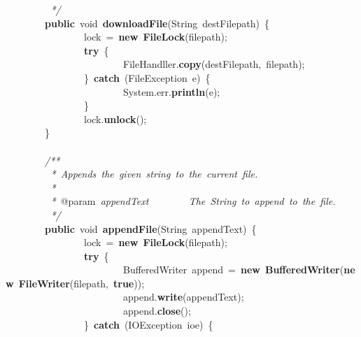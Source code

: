 \mbox{}\textit{\ \ \ \ \ \ \ \ \ */} \\
\mbox{}\ \ \ \ \ \ \ \ \textbf{public}\ void\ \textbf{downloadFile}(String\ destFilepath)\ \{ \\
\mbox{}\ \ \ \ \ \ \ \ \ \ \ \ \ \ \ \ lock\ =\ \textbf{new}\ \textbf{FileLock}(filepath); \\
\mbox{}\ \ \ \ \ \ \ \ \ \ \ \ \ \ \ \ \textbf{try}\ \{ \\
\mbox{}\ \ \ \ \ \ \ \ \ \ \ \ \ \ \ \ \ \ \ \ \ \ \ \ FileHandller.\textbf{copy}(destFilepath,\ filepath); \\
\mbox{}\ \ \ \ \ \ \ \ \ \ \ \ \ \ \ \ \}\ \textbf{catch}\ (FileException\ e)\ \{ \\
\mbox{}\ \ \ \ \ \ \ \ \ \ \ \ \ \ \ \ \ \ \ \ \ \ \ \ System.err.\textbf{println}(e); \\
\mbox{}\ \ \ \ \ \ \ \ \ \ \ \ \ \ \ \ \} \\
\mbox{}\ \ \ \ \ \ \ \ \ \ \ \ \ \ \ \ lock.\textbf{unlock}(); \\
\mbox{}\ \ \ \ \ \ \ \ \} \\
\mbox{} \\
\mbox{}\ \ \ \ \ \ \ \ \textit{/**} \\
\mbox{}\textit{\ \ \ \ \ \ \ \ \ *\ Appends\ the\ given\ string\ to\ the\ current\ file.} \\
\mbox{}\textit{\ \ \ \ \ \ \ \ \ *} \\
\mbox{}\textit{\ \ \ \ \ \ \ \ \ *\ }@param\textit{\ appendText\ \ \ \ \ \ \ \ The\ String\ to\ append\ to\ the\ file.} \\
\mbox{}\textit{\ \ \ \ \ \ \ \ \ */} \\
\mbox{}\ \ \ \ \ \ \ \ \textbf{public}\ void\ \textbf{appendFile}(String\ appendText)\ \{ \\
\mbox{}\ \ \ \ \ \ \ \ \ \ \ \ \ \ \ \ lock\ =\ \textbf{new}\ \textbf{FileLock}(filepath); \\
\mbox{}\ \ \ \ \ \ \ \ \ \ \ \ \ \ \ \ \textbf{try}\ \{ \\
\mbox{}\ \ \ \ \ \ \ \ \ \ \ \ \ \ \ \ \ \ \ \ \ \ \ \ BufferedWriter\ append\ =\ \textbf{new}\ \textbf{BufferedWriter}(\textbf{new}\ \textbf{FileWriter}(filepath,\ \textbf{true})); \\
\mbox{}\ \ \ \ \ \ \ \ \ \ \ \ \ \ \ \ \ \ \ \ \ \ \ \ append.\textbf{write}(appendText); \\
\mbox{}\ \ \ \ \ \ \ \ \ \ \ \ \ \ \ \ \ \ \ \ \ \ \ \ append.\textbf{close}(); \\
\mbox{}\ \ \ \ \ \ \ \ \ \ \ \ \ \ \ \ \}\ \textbf{catch}\ (IOException\ ioe)\ \{ \\
